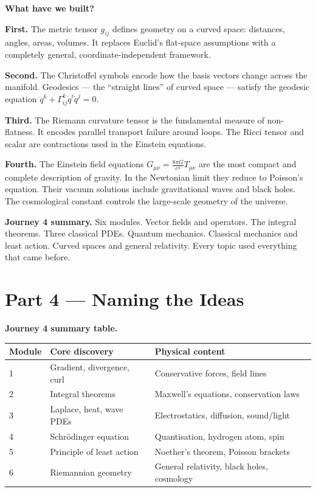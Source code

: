 \documentclass[12pt,a4paper]{article}
\begin{document}
\begin{discoverybox}
\textbf{What have we built?}

\textbf{First.} The metric tensor $g_{ij}$ defines geometry on a curved space: distances, angles, areas, volumes. It replaces Euclid's flat-space assumptions with a completely general, coordinate-independent framework.

\textbf{Second.} The Christoffel symbols encode how the basis vectors change across the manifold. Geodesics --- the ``straight lines'' of curved space --- satisfy the geodesic equation $\ddot q^k+\Gamma^k_{ij}\dot q^i\dot q^j=0$.

\textbf{Third.} The Riemann curvature tensor is the fundamental measure of non-flatness. It encodes parallel transport failure around loops. The Ricci tensor and scalar are contractions used in the Einstein equations.

\textbf{Fourth.} The Einstein field equations $G_{\mu\nu}=\frac{8\pi G}{c^4}T_{\mu\nu}$ are the most compact and complete description of gravity. In the Newtonian limit they reduce to Poisson's equation. Their vacuum solutions include gravitational waves and black holes. The cosmological constant controls the large-scale geometry of the universe.

\medskip
\textbf{Journey 4 summary.} Six modules. Vector fields and operators. The integral theorems. Three classical PDEs. Quantum mechanics. Classical mechanics and least action. Curved spaces and general relativity. Every topic used everything that came before.
\end{discoverybox}

\section{Part 4 \texorpdfstring{---}{--} Naming the Ideas}

\begin{namebox}
\textbf{Journey 4 summary table.}
\medskip
\begin{center}
\renewcommand{\arraystretch}{1.5}
\begin{tabular}{l l l}
\toprule
\textbf{Module} & \textbf{Core discovery} & \textbf{Physical content} \\
\midrule
1 & Gradient, divergence, curl & Conservative forces, field lines \\
2 & Integral theorems & Maxwell's equations, conservation laws \\
3 & Laplace, heat, wave PDEs & Electrostatics, diffusion, sound/light \\
4 & Schr\"{o}dinger equation & Quantisation, hydrogen atom, spin \\
5 & Principle of least action & Noether's theorem, Poisson brackets \\
6 & Riemannian geometry & General relativity, black holes, cosmology \\
\bottomrule
\end{tabular}
\end{center}
\end{namebox}
\end{document}
